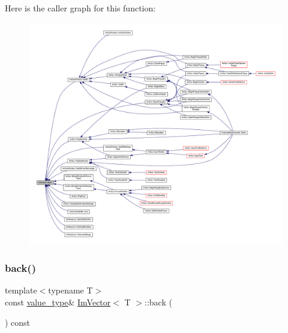 Here is the caller graph for this function\+:
\nopagebreak
\begin{figure}[H]
\begin{center}
\leavevmode
\includegraphics[width=350pt]{class_im_vector_a3e4424d3fca190894598a6575f9d2401_icgraph}
\end{center}
\end{figure}
\mbox{\label{class_im_vector_a6f22918d4f139a1c4c3410ccae726f81}} 
\subsubsection{\texorpdfstring{back()}{back()}\hspace{0.1cm}{\footnotesize\ttfamily [2/2]}}
{\footnotesize\ttfamily template$<$typename T$>$ \\
const \mbox{\hyperlink{class_im_vector_a8bd77e4e7581d8e5f9e98d7c2f3c2a80}{value\+\_\+type}}\& \mbox{\hyperlink{class_im_vector}{Im\+Vector}}$<$ T $>$\+::back (\begin{DoxyParamCaption}{ }\end{DoxyParamCaption}) const\hspace{0.3cm}{\ttfamily [inline]}}

\mbox{\label{class_im_vector_a300a8b559cd87a78063046ef81151bce}} 
